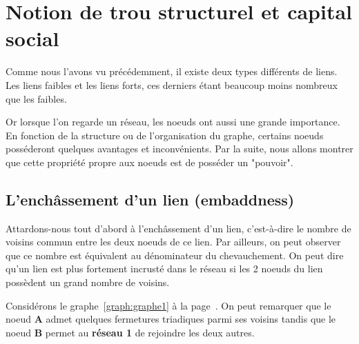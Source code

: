 



%
%

\section{Notion de trou structurel et capital social}
Comme nous l'avons vu précédemment, il existe deux types différents de liens. Les liens faibles et les liens forts, ces derniers étant beaucoup moins nombreux que les faibles.

Or lorsque l'on regarde un réseau, les noeuds ont aussi une grande importance. En fonction de la structure ou de l'organisation du graphe, certains noeuds posséderont quelques avantages et inconvénients. 
Par la suite, nous allons montrer que cette propriété propre aux noeuds est de posséder un "pouvoir".

\subsection{L'enchâssement d'un lien (embaddness)}
Attardons-nous tout d'abord à l'enchâssement d'un lien, c'est-à-dire le nombre de voisins commun entre les deux noeuds de ce lien. Par ailleurs, on peut observer que ce nombre est équivalent au dénominateur du chevauchement.
On peut dire qu'un lien est plus fortement incrusté dans le réseau si les 2 noeuds du lien possèdent un grand nombre de voisins. 

Considérons le graphe~\ref{graph:graphe1} à la page~\pageref{graph:graphe1}. On peut remarquer que le noeud \textbf{A} admet quelques fermetures triadiques parmi ses voisins tandis que le noeud \textbf{B} permet au \textbf{réseau 1} de rejoindre les deux autres.

